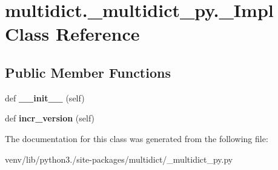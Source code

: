 \hypertarget{classmultidict_1_1__multidict__py_1_1___impl}{}\section{multidict.\+\_\+multidict\+\_\+py.\+\_\+\+Impl Class Reference}
\label{classmultidict_1_1__multidict__py_1_1___impl}
\subsection*{Public Member Functions}
\begin{DoxyCompactItemize}
\item 
\mbox{\label{classmultidict_1_1__multidict__py_1_1___impl_ae3f54bf4d6cf2cd38c43f143ffc0a2e0}} 
def {\bfseries \+\_\+\+\_\+init\+\_\+\+\_\+} (self)
\item 
\mbox{\label{classmultidict_1_1__multidict__py_1_1___impl_af6e41d9b00e8aec617fb6758103fcf23}} 
def {\bfseries incr\+\_\+version} (self)
\end{DoxyCompactItemize}


The documentation for this class was generated from the following file\+:\begin{DoxyCompactItemize}
\item 
venv/lib/python3./site-\/packages/multidict/\+\_\+multidict\+\_\+py.\+py\end{DoxyCompactItemize}
